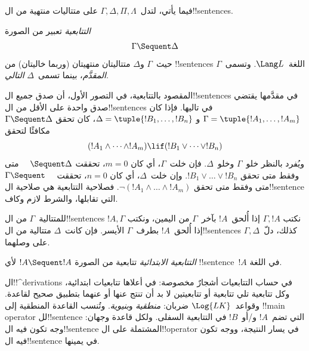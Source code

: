 \documentclass[../../../include/open-logic-section]{subfiles}
\begin{document}
      {}
      {}


فيما يأتي، لتدل~$\Gamma, \Delta, \Pi, \Lambda$ على متتاليات منتهية
من ال!!{sentence}s.

\begin{defn}[التتابعية]
\emph{التتابعية} تعبير من الصورة
\[
\Gamma \Sequent \Delta
\]
حيث~$\Gamma$ و$\Delta$ متتاليتان منتهيتان (وربما خاليتان) من
!!{sentence}s اللغة~$\Lang L$. وتسمى~$\Gamma$ \emph{المقدَّم}، بينما
تسمى~$\Delta$ \emph{التالي}.
\end{defn}

\begin{explain}
المقصود بالتتابعية، في التصور الأول، أن صدق جميع ال!!{sentence}s في مقدَّمها يقتضي صدق واحدة على الأقل من ال!!{sentence}s في تاليها.
فإذا كان $\Gamma = \tuple{!A_1, \dots, !A_m}$ و
$\Delta = \tuple{!B_1, \dots, !B_n}$، كان تحقق $\Gamma \Sequent \Delta$
مكافئًا لتحقق
\[
(!A_1 \land \cdots \land !A_m) \lif (!B_1 \lor \cdots \lor
!B_n)
\]
ويُفرد بالنظر خلو~$\Gamma$ وخلو~$\Delta$.
فإن خلت~$\Gamma$، أي كان $m = 0$، تحققت $\quad
\Sequent \Delta$ متى وفقط متى تحقق
$!B_1 \lor \dots \lor !B_n$.
وإن خلت~$\Delta$، أي كان $n = 0$، تحققت $\Gamma \Sequent \quad$
متى وفقط متى تحقق
$\lnot(!A_1 \land \dots \land !A_m)$.
فصلاحية التتابعية هي صلاحية ال!!{sentence} التي تقابلها، والشرط لازم وكاف.
\end{explain}

للمتتالية~$\Gamma$ من ال!!{sentence}s نكتب $\Gamma, !A$
إذا أُلحق~$!A$ بآخر~$\Gamma$ من اليمين، ونكتب $!A, \Gamma$
إذا أُلحق~$!A$ بطرف~$\Gamma$ الأيسر. فإن كانت~$\Delta$
متتالية من ال!!{sentence}s كذلك، دلّ~$\Gamma, \Delta$ على وصلهما.

\begin{defn}
\emph{التتابعية الابتدائية} تتابعية
{من الصورة $!A \Sequent !A$} لأي !!{sentence}~$!A$ في اللغة.
\end{defn}

ال!!^{derivation}s في حساب التتابعيات أشجارٌ مخصوصة: في أعلاها تتابعيات ابتدائية، وكل تتابعية تلي تتابعية أو تتابعيتين لا بد أن تنتج عنها أو عنهما بتطبيق صحيح لقاعدة.
وقواعد~$\Log{LK}$ ضربان: \emph{منطقية} و\emph{بنيوية}.
وتُنسب القاعدة المنطقية إلى !!{main operator} لل!!{sentence} التي تضم~$!A$ و/أو~$!B$ في التتابعية السفلى.
ولكل قاعدة وجهان: وجه تكون فيه ال!!{sentence} المشتملة على ال!!{operator} في يسار النتيجة، ووجه تكون فيه ال!!{sentence} في يمينها.
\end{document}
